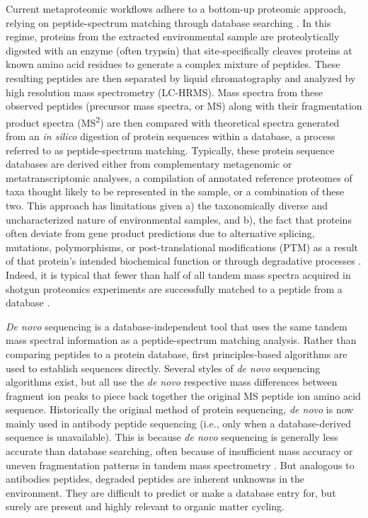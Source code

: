 \documentclass[12pt, letterpaper, twoside]{article}
\begin{document}
Current metaproteomic workflows adhere to a bottom-up proteomic approach, relying on peptide-spectrum matching through database searching \cite{saito_progress_2019}. In this regime, proteins from the extracted environmental sample are proteolytically digested with an enzyme (often trypsin) that site-specifically cleaves proteins at known amino acid residues to generate a complex mixture of peptides. These resulting peptides are then separated by liquid chromatography and analyzed by high resolution mass spectrometry (LC-HRMS). Mass spectra from these observed peptides (precursor mass spectra, or MS) along with their fragmentation product spectra (MS\textsuperscript{2}) are then compared with theoretical spectra generated from an \textit{in silico} digestion of protein sequences within a database, a process referred to as peptide-spectrum matching. Typically, these protein sequence databases are derived either from complementary metagenomic or metatranscriptomic analyses, a compilation of annotated reference proteomes of taxa thought likely to be represented in the sample, or a combination of these two. This approach has limitations given a) the taxonomically diverse and uncharacterized nature of environmental samples, and b), the fact that proteins often deviate from gene product predictions due to alternative splicing, mutations, polymorphisms, or post-translational modifications (PTM) as a result of that protein’s intended biochemical function or through degradative processes \cite{kim_methionine_2014}. Indeed, it is typical that fewer than half of all tandem mass spectra acquired in shotgun proteomics experiments are successfully matched to a peptide from a database \cite{chick_mass-tolerant_2015}. 

\textit{De novo} sequencing is a database-independent tool that uses the same tandem mass spectral information as a peptide-spectrum matching analysis. Rather than comparing peptides to a protein database, first principles-based algorithms are used to establish sequences directly. Several styles of \textit{de novo} sequencing algorithms exist, but all use the \textit{de novo} respective mass differences between fragment ion peaks to piece back together the original MS peptide ion amino acid sequence.  Historically the original method of protein sequencing, \textit{de novo} is now mainly used in antibody peptide sequencing (i.e., only when a database-derived sequence is unavailable). This is because \textit{de novo} sequencing is generally less accurate than database searching, often because of insufficient mass accuracy \cite{muth_navigating_2015} or uneven fragmentation patterns in tandem mass spectrometry \cite{lu_algorithms_2004}. But analogous to antibodies peptides, degraded peptides are inherent unknowns in the environment. They are difficult to predict or make a database entry for, but surely are present and highly relevant to organic matter cycling. 
\end{document}
